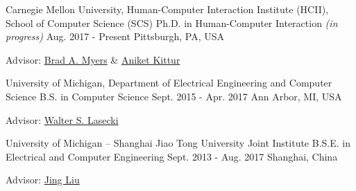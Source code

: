 

\begin{cventries}

  \cventry
    {Carnegie Mellon University, Human-Computer Interaction Institute (HCII), School of Computer Science (SCS)} %
    {Ph.D. in Human-Computer Interaction \bodyfontlight\mdseries\textit{(in progress)}} %
    {Aug. 2017 - Present} %
    {Pittsburgh, PA, USA} %
    {
      \begin{cvitems} %
        \item {Advisor: \href{http://www.cs.cmu.edu/~bam/}{Brad A. Myers} \& \href{http://kittur.org/}{Aniket Kittur}}
      \end{cvitems}
    }
  
  \cventry
    {University of Michigan, Department of Electrical Engineering and Computer Science} %
    {B.S. in Computer Science} %
    {Sept. 2015 - Apr. 2017} %
    {Ann Arbor, MI, USA} %
    {
      \begin{cvitems} %
        \item {Advisor: \href{http://wslasecki.com/}{Walter S. Lasecki}}
      \end{cvitems}
    }
  
  \cventry
    {University of Michigan – Shanghai Jiao Tong University Joint Institute} %
    {B.S.E. in Electrical and Computer Engineering} %
    {Sept. 2013 - Aug. 2017} %
    {Shanghai, China} %
    {
      \begin{cvitems} %
        \item {Advisor: \href{http://umji.sjtu.edu.cn/faculty/jing-liu/}{Jing Liu}}
      \end{cvitems}
    }

\end{cventries}
